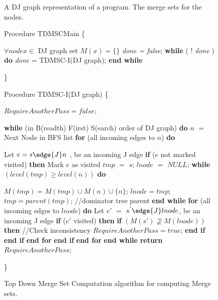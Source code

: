 \begin{figure}[!ht]
\centering
\begin{minipage}[t]{5in}
 A DJ graph representation of a program.
 The merge sets for the nodes.

\setcounter{linectr}{0}
Procedure TDMSCMain
\{
\begin{code}
 $\forall node x \in$ DJ graph set $M(x) = \{\}$
 {\it done = false};
 {\bf while} ( ! {\it done} ) {\bf do}
     {\it done} = TDMSC-I(DJ graph);
 {\bf end while}
\end{code}
\}

Procedure TDMSC-I(DJ graph)
\{
\begin{code}

 $RequireAnotherPass=false$;

 {\bf while} (in B(readth) F(irst) S(earch) order of DJ graph) {\bf do} \label{C:bfs}
      $n$ $=$ Next Node in BFS list
      {\bf for} (all incoming edges to $n$) {\bf do} \label{C:jedge}

          Let $e = s \edge{J} n$ , be an incoming J edge
          {\bf if} ($e$ not marked visited) {\bf then}
              Mark $e$ as visited 
              $tmp$ $=$ $s$;
              $lnode$ $=$ $NULL$;
              {\bf while} $(level(tmp)\ge level(n))$ {\bf do} \label{C:mwhiles}

                   $M(tmp)=M(tmp)\cup M(n)\cup \{n\}$;
                   $lnode=tmp$;
                   $tmp=parent(tmp)$; //dominator tree parent
              {\bf end while} \label{C:mwhilee}
              {\bf for} (all incoming edges to $lnode$) {\bf do} \label{C:lnode}
                  Let $e'$ $=$ $s^{'} \edge{J} lnode$, be an incoming J edge
                  {\bf if} ($e'$ visited) {\bf then}
                     {\bf if} $(M(s') \not\supseteq M(lnode))$ {\bf then} //Check inconsistency
                         $RequireAnotherPass = true$;
                     {\bf end if}
                  {\bf end if}
              {\bf end for}
          {\bf end if}
     {\bf end for}
 {\bf end while}
 {\bf return} $RequireAnotherPass$;
\end{code}
\}
\end{minipage}
\caption{Top Down Merge Set Computation algorithm for computing Merge sets.}
\label{F:tdmsc}
\end{figure} 

